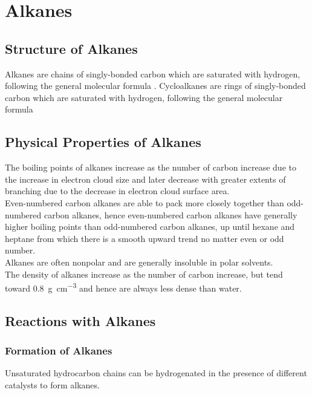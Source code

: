 \documentclass[../main]{subfiles}
\begin{document}
\section{Alkanes}

	\subsection{Structure of Alkanes}

	Alkanes are chains of singly-bonded carbon which are saturated with hydrogen, following the general molecular formula . Cycloalkanes are rings of singly-bonded carbon which are saturated with hydrogen, following the general molecular formula 

	\subsection{Physical Properties of Alkanes}

	The boiling points of alkanes increase as the number of carbon increase due to the increase in electron cloud size and later decrease with greater extents of branching due to the decrease in electron cloud surface area. \\

	Even-numbered carbon alkanes are able to pack more closely together than odd-numbered carbon alkanes, hence even-numbered carbon alkanes have generally higher boiling points than odd-numbered carbon alkanes, up until hexane and heptane from which there is a smooth upward trend no matter even or odd number. \\

	Alkanes are often nonpolar and are generally insoluble in polar solvents. \\

	The density of alkanes increase as the number of carbon increase, but tend toward \SI{0.8}{\g\per\cm\cubed} and hence are always less dense than water.

	\subsection{Reactions with Alkanes}

	\subsubsection{Formation of Alkanes}

	Unsaturated hydrocarbon chains can be hydrogenated in the presence of different catalysts to form alkanes. \\
\end{document}
